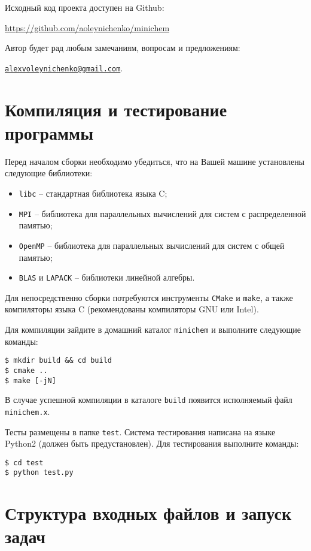 \documentclass[a4paper, 12pt]{article}
\begin{document}
Исходный код проекта доступен на Github:

\url{https://github.com/aoleynichenko/minichem}

\bigskip

Автор будет рад любым замечаниям, вопросам и предложениям:

\href{mailto:alexvoleynichenko@gmail.com}{\nolinkurl{alexvoleynichenko@gmail.com}}.


\section{Компиляция и тестирование программы}

Перед началом сборки необходимо убедиться, что на Вашей машине установлены следующие библиотеки:

\begin{itemize}
\item \texttt{libc} -- стандартная библиотека языка C;
\item \texttt{MPI} -- библиотека для параллельных вычислений для систем с распределенной памятью;
\item \texttt{OpenMP} -- библиотека для параллельных вычислений для систем с общей памятью;
\item \texttt{BLAS} и \texttt{LAPACK} -- библиотеки линейной алгебры.
\end{itemize}

Для непосредственно сборки потребуются инструменты \texttt{CMake} и \texttt{make}, а также компиляторы языка C (рекомендованы компиляторы GNU или Intel).

Для компиляции зайдите в домашний каталог \texttt{minichem} и выполните следующие команды:

\begin{lstlisting}
$ mkdir build && cd build
$ cmake ..
$ make [-jN]
\end{lstlisting}

В случае успешной компиляции в каталоге \texttt{build} появится исполняемый файл \texttt{minichem.x}.

Тесты размещены в папке \texttt{test}. Система тестирования написана на языке Python2 (должен быть предустановлен). Для тестирования выполните команды:

\begin{lstlisting}
$ cd test
$ python test.py
\end{lstlisting}


\section{Структура входных файлов и запуск задач}
\end{document}

